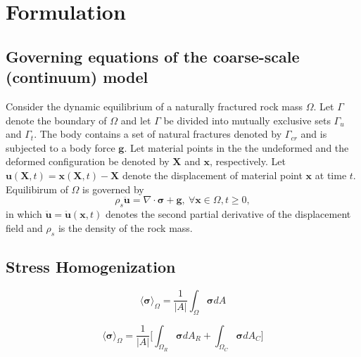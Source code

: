 \section{Formulation}

\subsection{Governing equations of the coarse-scale (continuum) model}
Consider the dynamic equilibrium of a naturally fractured rock mass $\Omega$. Let $\Gamma$ denote the boundary of $\Omega$ and let $\Gamma$ be divided into mutually exclusive sets $\Gamma_u$ and $\Gamma_t$.   The body contains a set of natural fractures denoted by $\Gamma_{cr}$ and is subjected to a body force $\mathbf{g}$.  Let material points in the the undeformed and the deformed configuration be denoted by $\mathbf{X}$ and $\mathbf{x}$, respectively. Let $\mathbf{u}\left(\mathbf{X}, t\right)=\mathbf{x}\left(\mathbf{X}, t\right)-\mathbf{X}$ denote the displacement of material point $\mathbf{x}$ at time $t$.    Equilibirum of $\Omega$ is governed by
\begin{equation}
\label{eqn:equil}
\rho_s \ddot{\mathbf{u}} =\nabla \cdot \boldsymbol{\sigma} +\mathbf{g},\:\forall \mathbf{x}\in\Omega, t\geq0,
\end{equation}
in which $\ddot{\mathbf{u}}=\ddot{\mathbf{u}}\left(\mathbf{x}, t\right)$ denotes the second partial derivative of the displacement field and $\rho_s$ is the density of the rock mass. 





\subsection{Stress Homogenization}

\begin{equation}
\label{eqn:stressav}
\langle \boldsymbol{\sigma} \rangle_\Omega = \frac{1}{\vert A \vert} \int_\Omega \boldsymbol{\sigma} {dA}
\end{equation}

\begin{equation}
\label{eqn:stresssplit}
\langle \boldsymbol{\sigma} \rangle_\Omega = \frac{1}{\vert A \vert} \big \lbrack {\int_{\Omega_{R}} \boldsymbol{\sigma} {dA_R} + \int_{\Omega_{C}} \boldsymbol{\sigma} {dA_C}} \big \rbrack
\end{equation}

